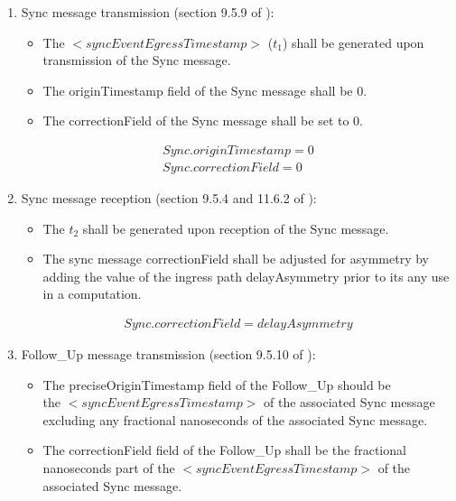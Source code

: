 \documentclass[a4paper, 12pt]{article}
\begin{document}
\begin{enumerate}
  \item Sync message transmission (section 9.5.9 of \cite{IEEE1588}):
    \begin{itemize}
      \item The $<syncEventEgressTimestamp>$  ($t_1$) shall be generated upon 
	    transmission of the Sync message.
      \item The originTimestamp field of the Sync message shall be 0.
      \item The correctionField of the Sync message shall be set to 0.
    \end{itemize}
	\begin{align}
	  \label{eq:Sync_tx}
	  Sync.originTimestamp = 0 \\
	  Sync.correctionField = 0
	\end{align}
  \item Sync message reception (section 9.5.4 and 11.6.2 of \cite{IEEE1588}):
    \begin{itemize}
      \item The $t_2$ shall be generated upon reception of the Sync message.
      \item The sync message correctionField shall be adjusted for asymmetry by adding the value of 
	    the ingress path delayAsymmetry prior to its any use in a computation.
    \end{itemize}
	\begin{align}
	  \label{eq:Sync_rx}
	  Sync.correctionField = delayAsymmetry
	\end{align}
  \item Follow\_Up message transmission (section 9.5.10 of \cite{IEEE1588}):
    \begin{itemize}
      \item The preciseOriginTimestamp field of the Follow\_Up should be \\
	    the $<syncEventEgressTimestamp>$ of the associated Sync message excluding 
	    any fractional nanoseconds of the associated Sync message.
      \item The correctionField field of the Follow\_Up shall be the fractional nanoseconds part of 
	    the $<syncEventEgressTimestamp>$ of the associated Sync message.
    \end{itemize}

\end{enumerate}
\end{document}
